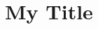 \documentclass[main]{subfiles}
\begin{document}
\chapter{My Title}
\cite{key}
\ifSubfilesClassLoaded{%

}{}
\end{document}
